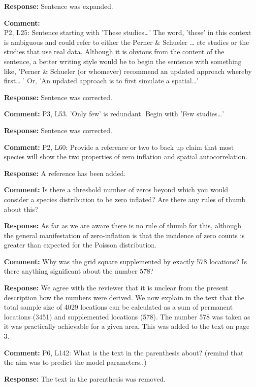 \documentclass{letter}
\begin{document}
\begin{letter}
\textbf{Response:}
Sentence was expanded.

\textbf{Comment:} \\
P2, L25: Sentence starting with 'These studies…' The word, 'these' in this context is ambiguous and could refer to either the Perner \& Schueler … etc studies or the studies that use real data. Although it is obvious from the content of the sentence, a better writing style would be to begin the sentence with something like, 'Perner \& Schueler (or whomever) recommend an updated approach whereby first… ' Or, 'An updated approach is to first simulate a spatial…'

\textbf{Response:}
Sentence was corrected.

\textbf{Comment:} 
P3, L53. 'Only few' is redundant. Begin with 'Few studies…'

\textbf{Response:}
Sentence was corrected.

\textbf{Comment:} 
P2, L60: Provide a reference or two to back up claim that most species will show the two properties of zero inflation and spatial autocorrelation.

\textbf{Response:}
A reference has been added.

\textbf{Comment:} 
Is there a threshold number of zeros beyond which you would consider a species distribution to be zero inflated? Are there any rules of thumb about this? 

\textbf{Response:}
As far as we are aware there is no rule of thumb for this, although the general manifestation of zero-inflation is that the incidence of zero counts is greater than expected for the Poisson distribution.

\textbf{Comment:} 
Why was the grid square supplemented by exactly 578 locations? Is there anything significant about the number 578?

\textbf{Response:}
We agree with the reviewer that it is unclear from the present description how the numbers were derived. 
We now explain in the text that the total sample size of 4029 locations can be calculated as a sum of permanent locations (3451) and supplemented locations (578). 
The number 578 was taken as it was practically achievable for a given area. This was added to the text on page 3. 

\textbf{Comment:} 
P6, L142: What is the text in the parenthesis about? (remind that the aim was to predict the model parameters..)

\textbf{Response:}
The text in the parenthesis was removed.


\end{letter}
\end{document}
